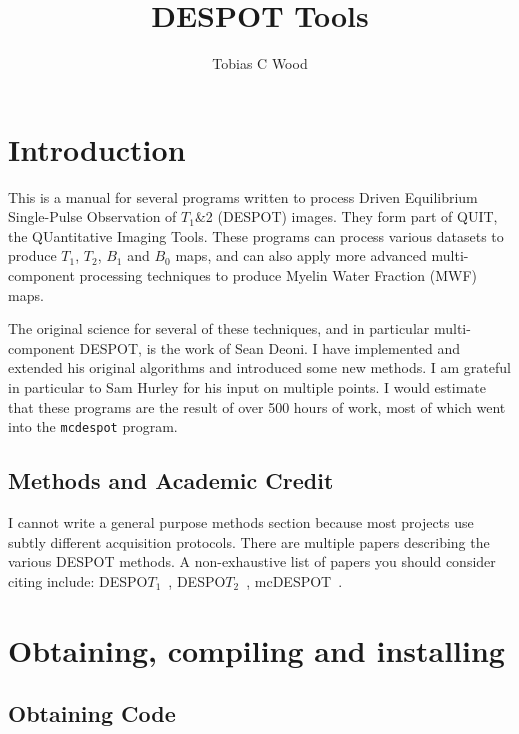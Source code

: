 \documentclass{report}
\begin{document}
\title{DESPOT Tools}
\author{Tobias C Wood}
\maketitle

\tableofcontents

\chapter{Introduction}

This is a manual for several programs written to process Driven Equilibrium Single-Pulse Observation of $T_1$\&2 (DESPOT) images. They form part of QUIT, the QUantitative Imaging Tools. These programs can process various datasets to produce $T_1$, $T_2$, $B_1$ and $B_0$ maps, and can also apply more advanced multi-component processing techniques to produce Myelin Water Fraction (MWF) maps.

The original science for several of these techniques, and in particular multi-component DESPOT, is the work of Sean Deoni. I have implemented and extended his original algorithms and introduced some new methods. I am grateful in particular to Sam Hurley for his input on multiple points. I would estimate that these programs are the result of over 500 hours of work, most of which went into the \texttt{mcdespot} program.

\section{Methods and Academic Credit}\label{credit}

I cannot write a general purpose methods section because most projects use subtly different acquisition protocols. 
There are multiple papers describing the various DESPOT methods. A non-exhaustive list of papers you should consider citing include: DESPO$T_1$~\cite{Deoni:2007}, DESPO$T_2$~\cite{Deoni:2009}, mcDESPOT~\cite{Deoni:2008c, Deoni:2012}.

\chapter{Obtaining, compiling and installing}

\section{Obtaining Code}
\end{document}
